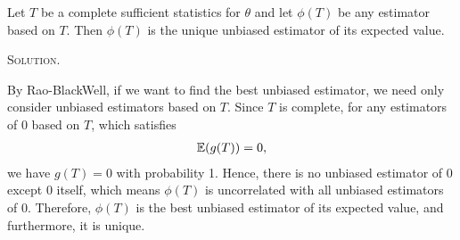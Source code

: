 \documentclass{article}
\begin{document}
\begin{CJK}{UTF8}{gbsn}
\begin{shaded}
        \noindent Let $T$ be a complete sufficient statistics for $\theta$ and let $\phi(T)$ be any
        estimator based on $T$. Then $\phi(T)$ is the unique unbiased estimator of its expected value.
    \end{shaded}
    \noindent\textsc{Solution.}\par
    By Rao-BlackWell, if we want to find the best unbiased estimator, we need only consider unbiased estimators
    based on $T$. Since $T$ is complete, for any estimators of 0 based on $T$, which satisfies
    \begin{align}
        {\mathbb E}(g(T)) = 0, \notag
    \end{align}
    we have $g(T) = 0$ with probability 1. Hence, there is no unbiased estimator of 0 except 0 itself, which
    means $\phi(T)$ is uncorrelated with all unbiased estimators of 0. Therefore, $\phi(T)$ is the best unbiased
    estimator of its expected value, and furthermore, it is unique.


\end{CJK}
\end{document}
